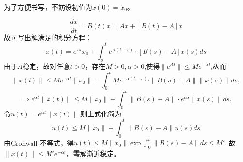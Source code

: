 \begin{proofc}[6的解答]
    为了方便书写，不妨设初值为$x(0)=x_0$。

\[\frac{dx}{dt}=B(t)x=Ax+[B(t)-A]x\] 
故可写出解满足的积分方程：
\[x(t)=e^{At}x_0+\int_o^t e^{A(t-s)}\cdot [B(s)-A]x(s)ds\]
由于$A$稳定，故对任意$t>0$，存在$M>0,\alpha>0$,使得$\|e^{At}\|\le M e^{-\alpha t}$,从而
\[\|x(t)\|\le M e^{-\alpha t}\|x_0\|+\int_0^t Me^{-\alpha(t-s)}\cdot \|B(s)-A\|\|x(s)\|ds,\]
\[\Rightarrow e^{\alpha t}\|x(t)\|\le M\|x_0\|+\int_0^t\|B(s)-A\|\cdot e^{\alpha s}\|x(s)\|ds.\]
令$u(t)=e^{\alpha t}\|x(t)\|$,则上式化简为
\[u(t)\le M\|x_0\|+\int_0^t\|B(s)-A\|u(s)ds\]
由Gronwall 不等式，得\(u(t)\le M\|x_0\|\exp{\int_0^t\|B(s)-A\|ds}\le M'.\)
故$\|x(t)\|\le M'e^{-\alpha t}$，零解渐近稳定。
\end{proofc}